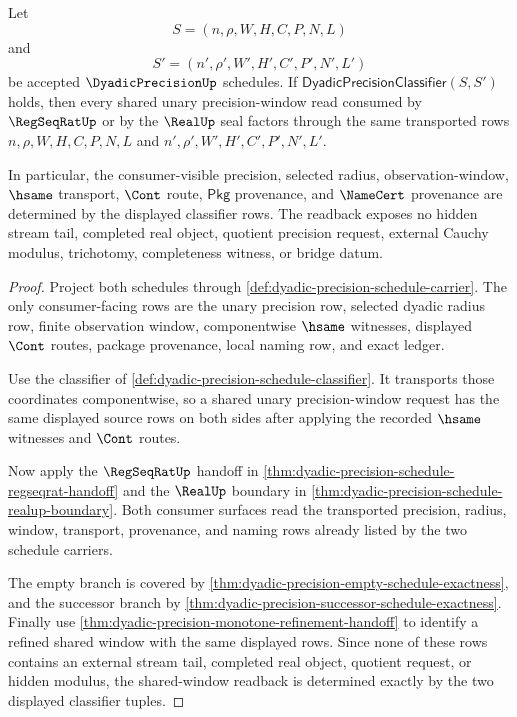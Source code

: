 \begin{theorem}
\label{thm:dyadicprecision-common-window-readback}
Let
$$
S=(n,\rho,W,H,C,P,N,L)
$$
and
$$
S'=(n',\rho',W',H',C',P',N',L')
$$
be accepted $\DyadicPrecisionUp$ schedules. If
$\mathsf{DyadicPrecisionClassifier}(S,S')$ holds, then every shared unary
precision-window read consumed by $\RegSeqRatUp$ or by the $\RealUp$ seal
factors through the same transported rows
$n,\rho,W,H,C,P,N,L$ and $n',\rho',W',H',C',P',N',L'$.

In particular, the consumer-visible precision, selected radius,
observation-window, $\hsame$ transport, $\Cont$ route, $\mathsf{Pkg}$
provenance, and $\NameCert$ provenance are determined by the displayed
classifier rows. The readback exposes no hidden stream tail, completed real
object, quotient precision request, external Cauchy modulus, trichotomy,
completeness witness, or bridge datum.
\end{theorem}
\begin{proof}
Project both schedules through
\autoref{def:dyadic-precision-schedule-carrier}. The only consumer-facing rows
are the unary precision row, selected dyadic radius row, finite observation
window, componentwise $\hsame$ witnesses, displayed $\Cont$ routes, package
provenance, local naming row, and exact ledger.

Use the classifier of
\autoref{def:dyadic-precision-schedule-classifier}. It transports those
coordinates componentwise, so a shared unary precision-window request has the
same displayed source rows on both sides after applying the recorded
$\hsame$ witnesses and $\Cont$ routes.

Now apply the $\RegSeqRatUp$ handoff in
\autoref{thm:dyadic-precision-schedule-regseqrat-handoff} and the $\RealUp$
boundary in \autoref{thm:dyadic-precision-schedule-realup-boundary}. Both
consumer surfaces read the transported precision, radius, window, transport,
provenance, and naming rows already listed by the two schedule carriers.

The empty branch is covered by
\autoref{thm:dyadic-precision-empty-schedule-exactness}, and the successor
branch by \autoref{thm:dyadic-precision-successor-schedule-exactness}. Finally
use \autoref{thm:dyadic-precision-monotone-refinement-handoff} to identify a
refined shared window with the same displayed rows. Since none of these rows
contains an external stream tail, completed real object, quotient request, or
hidden modulus, the shared-window readback is determined exactly by the two
displayed classifier tuples.
\end{proof}

